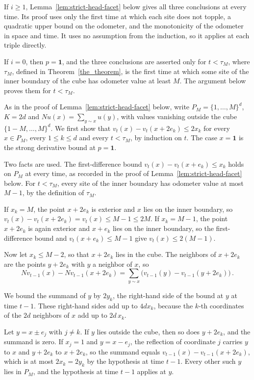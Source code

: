 \documentclass[12pt]{amsart}
\begin{document}
If $i\geq1$, Lemma~\ref{lem:strict-head-facet} below gives all three conclusions at every time. Its proof uses only the first time at which each site does not topple, a quadratic upper bound on the odometer, and the monotonicity of the odometer in space and time. It uses no assumption from the induction, so it applies at each triple directly.

If $i=0$, then $p=\mathbf{1}$, and the three conclusions are asserted only for $t<\tau_M$, where $\tau_M$, defined in Theorem~\ref{the_theorem}, is the first time at which some site of the inner boundary of the cube has odometer value at least $M$. The argument below proves them for $t<\tau_M$.

As in the proof of Lemma~\ref{lem:strict-head-facet} below, write $P_M=\{1,\ldots,M\}^d$, $K=2d$ and $Nu(x)=\sum_{y\sim x}u(y)$, with values vanishing outside the cube $\{1-M,\ldots,M\}^d$. We first show that $v_t(x)-v_t(x+2e_k)\leq 2x_k$ for every $x\in P_M$, every $1\leq k\leq d$ and every $t<\tau_M$, by induction on $t$. The case $x=\mathbf{1}$ is the strong derivative bound at $p=\mathbf{1}$.

Two facts are used. The first-difference bound $v_t(x)-v_t(x+e_k)\leq x_k$ holds on $P_M$ at every time, as recorded in the proof of Lemma~\ref{lem:strict-head-facet} below. For $t<\tau_M$, every site of the inner boundary has odometer value at most $M-1$, by the definition of $\tau_M$.

If $x_k=M$, the point $x+2e_k$ is exterior and $x$ lies on the inner boundary, so $v_t(x)-v_t(x+2e_k)=v_t(x)\leq M-1\leq 2M$. If $x_k=M-1$, the point $x+2e_k$ is again exterior and $x+e_k$ lies on the inner boundary, so the first-difference bound and $v_t(x+e_k)\leq M-1$ give $v_t(x)\leq 2(M-1)$.

Now let $x_k\leq M-2$, so that $x+2e_k$ lies in the cube. The neighbors of $x+2e_k$ are the points $y+2e_k$ with $y$ a neighbor of $x$, so
\begin{equation*}
Nv_{t-1}(x)-Nv_{t-1}(x+2e_k)=\sum_{y\sim x}\big(v_{t-1}(y)-v_{t-1}(y+2e_k)\big)\,.
\end{equation*}

We bound the summand of $y$ by $2y_k$, the right-hand side of the bound at $y$ at time $t-1$. These right-hand sides add up to $4dx_k$, because the $k$-th coordinates of the $2d$ neighbors of $x$ add up to $2d\,x_k$.

Let $y=x\pm e_j$ with $j\neq k$. If $y$ lies outside the cube, then so does $y+2e_k$, and the summand is zero. If $x_j=1$ and $y=x-e_j$, the reflection of coordinate $j$ carries $y$ to $x$ and $y+2e_k$ to $x+2e_k$, so the summand equals $v_{t-1}(x)-v_{t-1}(x+2e_k)$, which is at most $2x_k=2y_k$ by the hypothesis at time $t-1$. Every other such $y$ lies in $P_M$, and the hypothesis at time $t-1$ applies at $y$.
\end{document}
